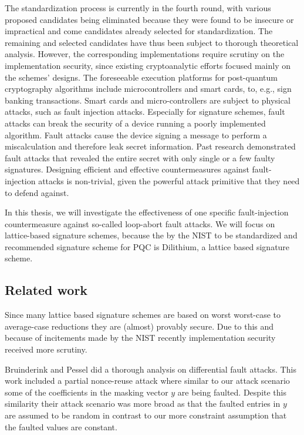\documentclass[a4paper,titlepage]{article}
\begin{document}
The standardization process is currently in the fourth round, with various proposed candidates being eliminated because they were found to be insecure or impractical and come candidates already selected for standardization. The remaining and selected candidates have thus been subject to thorough theoretical analysis.  However, the corresponding implementations require scrutiny on the implementation security, since existing cryptoanalytic efforts focused mainly on the schemes' designs. The foreseeable execution platforms for post-quantum cryptography algorithms include microcontrollers and smart cards, to, e.g., sign banking transactions. Smart cards and micro-controllers are subject to physical attacks, such as fault injection attacks. Especially for signature schemes, fault attacks can break the security of a device running a poorly implemented algorithm. 
Fault attacks cause the device signing a message to perform a miscalculation and therefore leak secret information. Past research demonstrated fault attacks that revealed  the entire secret with only single or a few faulty signatures. \cite{faultseifert} Designing efficient and effective countermeasures against fault-injection attacks is non-trivial, given the powerful attack primitive that they need to defend against. 

In this thesis, we will investigate the effectiveness of one specific fault-injection countermeasure against so-called loop-abort fault attacks. We will focus on lattice-based signature schemes, because the by the NIST to be standardized and recommended signature scheme for PQC is Dilithium, a lattice based signature scheme.
\subsection{Related work}
Since many lattice based signature schemes are based on worst worst-case to average-case reductions \cite{sis} they are (almost) provably secure. Due to this and because of incitements made by the NIST recently \cite{nistcall,nistsecond} implementation security received more scrutiny. 

Bruinderink and Pessel did a thorough analysis on differential fault attacks. \cite{Groot_Bruinderink_Pessl_2018} This work included a partial nonce-reuse attack where similar to our attack scenario some of the coefficients in the masking vector $y$ are being faulted. Despite this similarity their attack scenario was more broad as that the faulted entries in $y$ are assumed to be random in contrast to our more constraint assumption that the faulted values are constant.  
\end{document}
